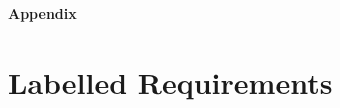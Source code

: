 \appendix
\setcounter{section}{0}
\pagebreak 
\clearpage
\thispagestyle{empty} %
\vspace*{9cm}
\begin{center}
{\bf \LARGE Appendix}
\end{center}
\vfill
\pagebreak

\section{Labelled Requirements}
\label{app:labelled-requirements}

